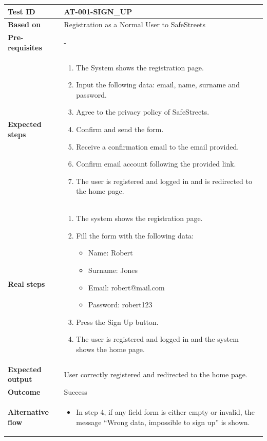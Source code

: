 \begin{table}[H]
    \centering
    \begin{tabular}{p{3cm}p{10cm}}
    \textbf{Test ID} & AT-001-SIGN\_UP \\ \hline
    \textbf{Based on} & Registration as a Normal User to SafeStreets \\ \hline
    \textbf{Pre-requisites} & - \\ \hline
    \textbf{Expected steps} & 
        \begin{enumerate} \itemsep0em
            \item The System shows the registration page.
            \item Input the following data: email, name, surname and password.
            \item Agree to the privacy policy of SafeStreets.
            \item Confirm and send the form.
            \item Receive a confirmation email to the email provided.
            \item Confirm email account following the provided link.
            \item The user is registered and logged in and is redirected to the home page.
        \end{enumerate} \\ \hline
    \textbf{Real steps} & 
        \begin{enumerate} \itemsep0em
            \item The system shows the registration page.
            \item Fill the form with the following data:
                \begin{itemize}[label={}] \itemsep0em
                    \item Name: Robert
                    \item Surname: Jones
                    \item Email: robert@mail.com
                    \item Password: robert123
                \end{itemize}
            \item Press the Sign Up button.
            \item The user is registered and logged in and the system shows the home page.
        \end{enumerate} \\ \hline
    \textbf{Expected output} & User correctly registered and redirected to the home page. \\ \hline
    \textbf{Outcome} & Success \\ \hline
    \textbf{Alternative flow} & 
        \begin{itemize} \itemsep0em
            \item In step 4, if any field form is either empty or invalid, the message “Wrong data, impossible to sign up” is shown.
        \end{itemize} \\ \hline
    \end{tabular}
\end{table}

